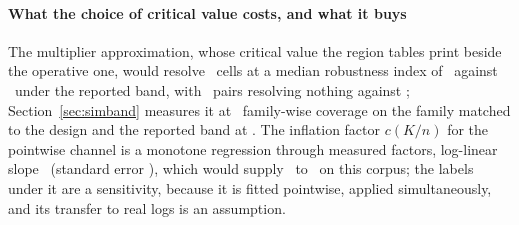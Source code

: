 \paragraph{What the choice of critical value costs, and what it buys}
The multiplier approximation, whose critical value the region tables print
beside the operative one, would resolve \nResolvedWholeMult\ cells at a
median robustness index of \rhoMedianMult\ against \rhoMedian\ under the
reported band, with \nPairsResolvingNothingMult\ pairs resolving nothing
against \nUnresolvedPairs; Section~\ref{sec:simband} measures it at
\covMultHeavyWholeAtDesign\ family-wise coverage on the family matched to the
design and the reported band at \covEmpHeavyWholeAtDesign. The inflation
factor $c(K/n)$ for the pointwise channel is a monotone regression through
measured factors, log-linear slope \calSlope\ (standard error \calSlopeSe),
which would supply \calMin\ to \calMax\ on this corpus; the labels under it
are a sensitivity, because it is fitted pointwise, applied simultaneously, and
its transfer to real logs is an assumption.


